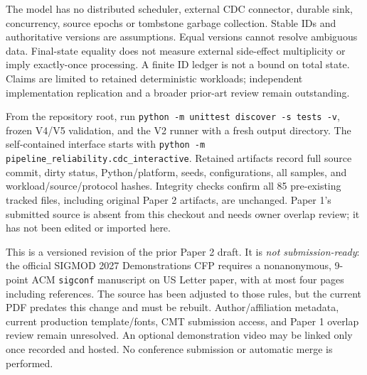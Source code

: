 \documentclass[sigconf,9pt,review]{acmart}
\begin{document}
The model has no distributed scheduler, external CDC connector, durable sink,
concurrency, source epochs or tombstone garbage collection. Stable IDs and authoritative
versions are assumptions. Equal versions cannot resolve ambiguous data. Final-state
equality does not measure external side-effect multiplicity or imply exactly-once
processing. A finite ID ledger is not a bound on total state. Claims are limited to
retained deterministic workloads; independent implementation replication and a
broader prior-art review remain outstanding.

From the repository root, run \texttt{python -m unittest discover -s tests -v}, frozen
V4/V5 validation, and the V2 runner with a fresh output directory. The self-contained
interface starts with \texttt{python -m pipeline\_reliability.cdc\_interactive}.
Retained artifacts record full source commit, dirty status, Python/platform, seeds,
configurations, all samples, and workload/source/protocol hashes. Integrity checks
confirm all 85 pre-existing tracked files, including original Paper 2 artifacts, are
unchanged. Paper 1's submitted source is absent from this checkout and needs owner
overlap review; it has not been edited or imported here.

This is a versioned revision of the prior Paper 2 draft. It is \emph{not submission-ready}:
the official SIGMOD 2027 Demonstrations CFP requires a nonanonymous, 9-point ACM
\texttt{sigconf} manuscript on US Letter paper, with at most four pages including
references. The source has been adjusted to those rules, but the current PDF predates
this change and must be rebuilt. Author/affiliation metadata, current production
template/fonts, CMT submission access, and Paper 1 overlap review remain unresolved.
An optional demonstration video may be linked only once recorded and hosted. No
conference submission or automatic merge is performed.


\end{document}
